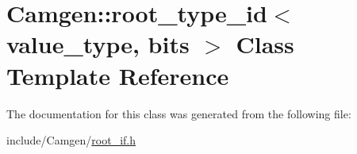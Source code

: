 \hypertarget{a00471}{\section{Camgen\-:\-:root\-\_\-type\-\_\-id$<$ value\-\_\-type, bits $>$ Class Template Reference}
\label{a00471}
}


The documentation for this class was generated from the following file\-:\begin{DoxyCompactItemize}
\item 
include/\-Camgen/\hyperlink{a00732}{root\-\_\-if.\-h}\end{DoxyCompactItemize}
